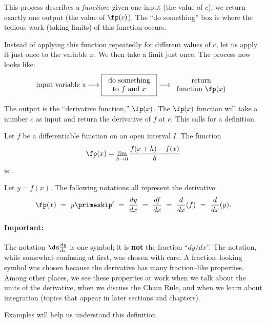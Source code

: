 This process describes a \textit{function}; given one input (the value of $c$), we return exactly one output (the value of $\fp(c)$). The ``do something'' box is where the tedious work (taking limits) of this function occurs. 

Instead of applying this function repeatedly for different values of $c$, let us apply it just once to the variable $x$. We then take a limit just once. The process now looks like:
\[
\text{input variable x}
\longrightarrow
\fbox{\begin{tabular}{c}do something\\to $f$ and $x$\end{tabular}}
\longrightarrow
\begin{tabular}{c}return\\function $\fp(x)$\end{tabular}
\]

The output is the ``derivative function,'' $\fp(x)$. The $\fp(x)$ function will take a number $c$ as input and return the derivative of $f$ at $c$. This calls for a definition.

{Let $f$ be a differentiable function on an open interval $I$. The function
\[\fp(x) = \lim_{h\to 0} \frac{f(x+h)-f(x)}{h}\]
is .\\


Let $y = f(x)$. The following notations all represent the derivative:
\[\fp(x)\ =\ y\primeskip'\ =\ \frac{dy}{dx}\ =\ \frac{df}{dx}\ =\ \frac{d}{dx}(f)\ =\ \frac{d}{dx}(y).\]}

\paragraph{Important: } The notation $\ds \frac{dy}{dx}$ is one symbol; it is \textbf{not} the fraction ``$dy/dx$''. The notation, while somewhat confusing at first, was chosen with care. A fraction--looking symbol was chosen because the derivative has many fraction--like properties. Among other places, we see these properties at work when we talk about the units of the derivative, when we discuss the Chain Rule, and when we learn about integration (topics that appear in later sections and chapters).\bigskip

Examples will help us understand this definition.

